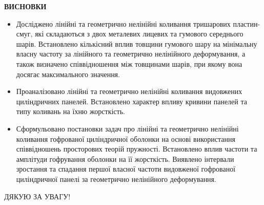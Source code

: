 \documentclass[handout, 8pt]{beamer}
\numberwithin{figure}{section}
\numberwithin{equation}{section}
\numberwithin{table}{section}
\begin{document}
\begin{frame}
\textbf{\large ВИСНОВКИ}
\\
\vspace{1em}
\begin{itemize}
\item Досліджено лінійні та геометрично нелінійні коливання тришарових пластин-смуг, які складаються з двох металевих лицевих та гумового середнього шарів.  Встановлено кількісний вплив товщини гумового шару на мінімальну власну частоту за лінійного та геометрично нелінійного деформування, а також визначено співвідношення між товщинами шарів, при якому вона досягає максимального значення. 
\item Проаналізовано лінійні та геометрично нелінійні коливання видовжених циліндричних панелей. Встановлено характер впливу кривини панелей та типу коливань на їхню жорсткість. 
\item Сформульовано постановки задач про лінійні та геометрично нелінійні коливання гофрованої циліндричної оболонки на основі використання співвідношень просторових теорій пружності. Встановлено вплив частоти та амплітуди гофрування оболонки на її жорсткість. Виявлено інтервали зростання та спадання першої власної частоти видовженої гофрованої циліндричної панелі за геометрично нелінійного деформування.

\end{itemize}



\end{frame}

\begin{frame}
\begin{center}
\Huge ДЯКУЮ ЗА УВАГУ!
\end{center}
\end{frame}
\end{document}
